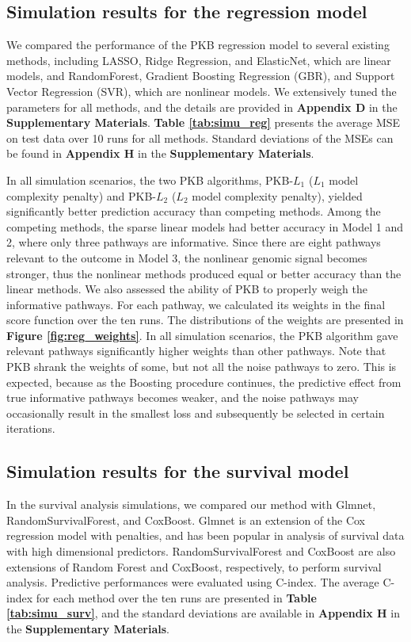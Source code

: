 \documentclass[a4paper,12pt]{article}
\begin{document}
\subsection{Simulation results for the regression model}
We compared the performance of the PKB regression model to several existing methods, including LASSO,\cite{tibshirani1996regression} Ridge Regression,\cite{hoerl1970ridge} and ElasticNet, \citep{zou2005regularization} which are linear models, and RandomForest,\citep{breiman2001random} Gradient Boosting Regression (GBR), \citep{friedman2001greedy} and Support Vector Regression (SVR),\citep{smola2004tutorial} which are nonlinear models. We extensively tuned the parameters for all methods, and the details are provided in \textbf{Appendix D} in the \textbf{Supplementary Materials}. \textbf{Table \ref{tab:simu_reg}} presents the average MSE on test data over 10 runs for all methods. Standard deviations of the MSEs can be found in \textbf{Appendix H} in the \textbf{Supplementary Materials}.

In all simulation scenarios, the two PKB algorithms, PKB-$L_1$ ($L_1$ model complexity penalty) and PKB-$L_2$ ($L_2$ model complexity penalty), yielded significantly better prediction accuracy than competing methods. Among the competing methods, the sparse linear models had better accuracy in Model 1 and 2, where only three pathways are informative. Since there are eight pathways relevant to the outcome in Model 3, the nonlinear genomic signal becomes stronger, thus the nonlinear methods produced equal or better accuracy than the linear methods. We also assessed the ability of PKB to properly weigh the informative pathways. For each pathway, we calculated its weights in the final score function over the ten runs. The distributions of the weights are presented in \textbf{Figure \ref{fig:reg_weights}}. In all simulation scenarios, the PKB algorithm gave relevant pathways significantly higher weights than other pathways. Note that PKB shrank the weights of some, but not all the noise pathways to zero. This is expected, because as the Boosting procedure continues, the predictive effect from true informative pathways becomes weaker, and the noise pathways may occasionally result in the smallest loss and subsequently be selected in certain iterations.

\subsection{Simulation results for the survival model}
In the survival analysis simulations, we compared our method with Glmnet,\citep{simon2011regularization} RandomSurvivalForest, \citep{ishwaran2008random} and CoxBoost. \citep{binder2013coxboost} Glmnet is an extension of the Cox regression model with penalties, and has been popular in analysis of survival data with high dimensional predictors. RandomSurvivalForest and CoxBoost are also extensions of Random Forest and CoxBoost, respectively,  to perform survival analysis. Predictive performances were evaluated using C-index. The average C-index for each method over the ten runs are presented in \textbf{Table \ref{tab:simu_surv}}, and the standard deviations are available in \textbf{Appendix H} in the \textbf{Supplementary Materials}. 
\end{document}
